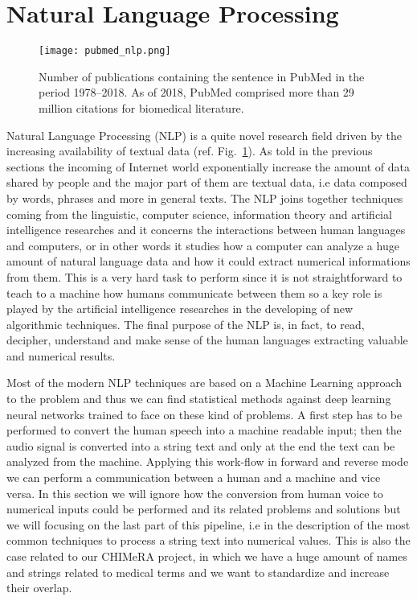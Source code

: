 \documentclass{standalone}
\begin{document}
\section[NLP]{Natural Language Processing}\label{chimera:nlp}


\begin{center}
\begin{figure}[htbp]
\centering
\texttt{[image: pubmed\_nlp.png]}
\caption{Number of publications containing the sentence  in PubMed in the period 1978–2018.
As of 2018, PubMed comprised more than 29 million citations for biomedical literature.
}
\label{fig:pubmed_nlp}
\end{figure}
\end{center}


Natural Language Processing (NLP) is a quite novel research field driven by the increasing availability of textual data (ref. Fig.~\ref{fig:pubmed_nlp}).
As told in the previous sections the incoming of Internet world exponentially increase the amount of data shared by people and the major part of them are textual data, i.e data composed by words, phrases and more in general texts.
The NLP joins together techniques coming from the linguistic, computer science, information theory and artificial intelligence researches and it concerns the interactions between human languages and computers, or in other words it studies how a computer can analyze a huge amount of natural language data and how it could extract numerical informations from them.
This is a very hard task to perform since it is not straightforward to teach to a machine how humans communicate between them so a key role is played by the artificial intelligence researches in the developing of new algorithmic techniques.
The final purpose of the NLP is, in fact, to read, decipher, understand and make sense of the human languages extracting valuable and numerical results.

Most of the modern NLP techniques are based on a Machine Learning approach to the problem and thus we can find statistical methods against deep learning neural networks trained to face on these kind of problems.
A first step has to be performed to convert the human speech into a machine readable input; then the audio signal is converted into a string text and only at the end the text can be analyzed from the machine.
Applying this work-flow in forward and reverse mode we can perform a communication between a human and a machine and vice versa.
In this section we will ignore how the conversion from human voice to numerical inputs could be performed and its related problems and solutions but we will focusing on the last part of this pipeline, i.e in the description of the most common techniques to process a string text into numerical values.
This is also the case related to our \textsf{CHIMeRA} project, in which we have a huge amount of names and strings related to medical terms and we want to standardize and increase their overlap.
\end{document}

